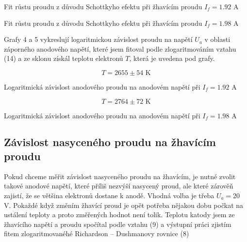 \documentclass[a4paper,11pt]{article}
\begin{document}
\begin{table}[h]
    \captionsetup{type=graph}
    \begin{minipage}{.47\linewidth}
        \centering
        \resizebox{\textwidth}{!}{  }
        \caption{Fit růstu proudu z důvodu Schottkyho efektu při žhavícím proudu $ I_f = 1.92 $ A }
    \end{minipage}
    \hfill
    \begin{minipage}{.45\linewidth}
        \centering
        \resizebox{\textwidth}{!}{  }
        \caption{Fit růstu proudu z důvodu Schottkyho efektu při žhavícím proudu $ I_f = 1.98 $ A }
    \end{minipage}
\end{table}

\newpage

Grafy 4 a 5 vykreslují logaritmickou závislost proudu na napětí $ U_a $ v oblasti záporného anodového napětí, které jsem fitoval podle zlogaritmováním vztahu (14) a ze sklonu získál teplotu elektronů $ T $, která je uvedena pod grafy. 

\begin{table}[h]
    \captionsetup{type=graph}
    \begin{minipage}{.45\linewidth}
        \centering
        \resizebox{\textwidth}{!}{  }
        \[ T = 2655 \pm 54 \text{ K} \]
        \caption{ Logaritmická závislost anodového proudu na anodovém napětí při $ I_f = 1.92 $ A }
    \end{minipage}
    \hfill
    \begin{minipage}{.45\linewidth}
        \centering
        \resizebox{\textwidth}{!}{  }
        \[ T = 2764 \pm 72 \text{ K} \]

        \caption{Logaritmická závislost anodového proudu na anodovém napětí při $ I_f = 1.98 $ A }
    \end{minipage}
\end{table}

\subsection{Závislost nasyceného proudu na žhavícím proudu}

Pokud chceme měřit závislost nasyceného proudu na žhavícím, je nutné zvolit takové anodové napětí, které příliš nezvýší nasycený proud, ale které zárověň zajistí, že se většina elektronů dostane k anodě. Vhodná volba je třeba $ U_a = 20 $ V. Pokaždé když změním žhavící proud je opět potřeba nějakou dobu počkat na ustálení teploty a proto změřených hodnot není tolik. Teplotu katody jsem ze žhavícího napětí a proudu spočítal podle vztahu (9) a výstupní práci zjistím fitem zlogaritmovanéhé Richardson – Dushmanovy rovnice (8)
\end{document}
